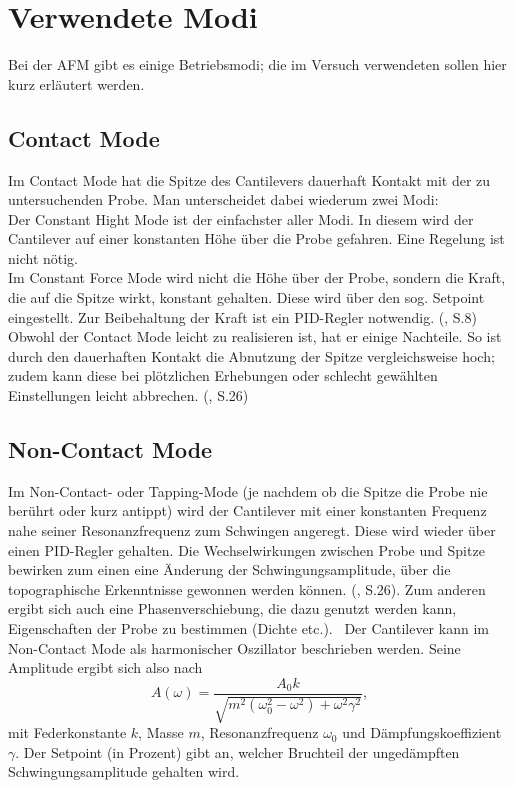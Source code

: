 \newpage


\section{Verwendete Modi}
\label{sec:Modi}
Bei der AFM gibt es einige Betriebsmodi; die im Versuch verwendeten sollen hier kurz erläutert werden.

\subsection{Contact Mode}
Im Contact Mode hat die Spitze des Cantilevers dauerhaft Kontakt mit der zu untersuchenden Probe. Man unterscheidet dabei wiederum zwei Modi: \\
Der Constant Hight Mode ist der einfachster aller Modi. In diesem wird der Cantilever auf einer konstanten Höhe über die Probe gefahren. 
Eine Regelung ist nicht nötig. \footnotemark \\
Im Constant Force Mode wird nicht die Höhe über der Probe, sondern die Kraft, die auf die Spitze wirkt, konstant gehalten. Diese wird 
über den sog. Setpoint eingestellt. Zur Beibehaltung der Kraft ist ein PID-Regler notwendig. (\cite{Rieger2013}, S.8)\\
Obwohl der Contact Mode leicht zu realisieren ist, hat er einige Nachteile. So ist durch den dauerhaften Kontakt die Abnutzung der Spitze 
vergleichsweise hoch; zudem kann diese bei plötzlichen Erhebungen oder schlecht gewählten Einstellungen leicht abbrechen. (\cite{Vesely2017}, S.26)

\subsection{Non-Contact Mode}
Im Non-Contact- oder Tapping-Mode (je nachdem ob die Spitze die Probe nie berührt oder kurz antippt) wird der Cantilever mit einer 
konstanten Frequenz nahe seiner Resonanzfrequenz zum Schwingen angeregt. Diese wird wieder über einen PID-Regler gehalten. 
Die Wechselwirkungen zwischen Probe und Spitze bewirken zum einen eine Änderung der Schwingungsamplitude, über die topographische 
Erkenntnisse gewonnen werden können. (\cite{Vesely2017}, S.26). Zum anderen ergibt sich auch eine Phasenverschiebung, die dazu genutzt 
werden kann, Eigenschaften der Probe zu bestimmen (Dichte etc.). \footnotemark \, Der Cantilever kann im Non-Contact Mode als harmonischer Oszillator beschrieben werden. 
Seine Amplitude ergibt sich also nach 
\begin{equation*}
    A(\omega) = \frac{A_0 k}{\sqrt{m^2(\omega_0^2 - \omega^2) + \omega^2 \gamma^2}},
\end{equation*}
mit Federkonstante $k$, Masse $m$, Resonanzfrequenz $\omega_0$ und Dämpfungskoeffizient $\gamma$. Der Setpoint (in Prozent) gibt an, welcher Bruchteil der ungedämpften 
Schwingungsamplitude gehalten wird.
 
